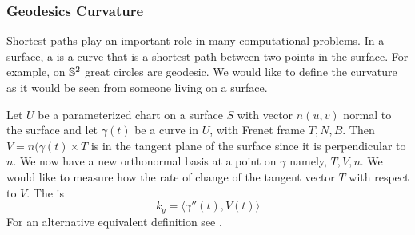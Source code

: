 \subsubsection{Geodesics Curvature}

Shortest paths play an important role in many computational problems.
In a surface, a  is a curve that is a shortest path
between two points in the surface. 
For example, on $\mathbb{S}^2$ great circles are geodesic.
We would like to define the curvature as it would be seen from
someone living on a surface.

Let $U$ be a parameterized chart on a surface $S$ with vector $n(u,v)$ normal
to the surface
and let $\gamma(t)$ be a curve in $U$, with Frenet frame $T,N,B$.
Then $V=n(\gamma(t)\times T$ is in the tangent plane of the surface since
it is perpendicular to $n$. We now have a new orthonormal basis at a point on $\gamma$
namely, $T,V,n$. 
We would like to measure how the rate of change of the tangent vector $T$ with respect to $V$.
The  is  
\begin{equation} \label{eqn:geodesic}
	k_g=\langle \gamma''(t),V(t)\rangle
\end{equation}
For an alternative equivalent definition see \cite{doc76}.




